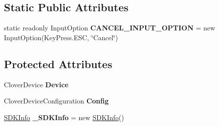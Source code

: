 \subsection*{Static Public Attributes}
\begin{DoxyCompactItemize}
\item 
\mbox{\label{classcom_1_1clover_1_1remotepay_1_1sdk_1_1_clover_connector_a1e3f722dd21198b83ac8eecbac983eb2}} 
static readonly Input\+Option {\bfseries C\+A\+N\+C\+E\+L\+\_\+\+I\+N\+P\+U\+T\+\_\+\+O\+P\+T\+I\+ON} = new Input\+Option(Key\+Press.\+E\+SC, \char`\"{}Cancel\char`\"{})
\end{DoxyCompactItemize}
\subsection*{Protected Attributes}
\begin{DoxyCompactItemize}
\item 
\mbox{\label{classcom_1_1clover_1_1remotepay_1_1sdk_1_1_clover_connector_ab2b2a13a2439cf33d0b83e31ba55d238}} 
Clover\+Device {\bfseries Device}
\item 
\mbox{\label{classcom_1_1clover_1_1remotepay_1_1sdk_1_1_clover_connector_a9e2be5acbf150aad37aed2d9670f38e0}} 
Clover\+Device\+Configuration {\bfseries Config}
\item 
\mbox{\label{classcom_1_1clover_1_1remotepay_1_1sdk_1_1_clover_connector_a873acd846f1efa474ad258356f2136cf}} 
\hyperlink{classcom_1_1clover_1_1remotepay_1_1sdk_1_1_s_d_k_info}{S\+D\+K\+Info} {\bfseries \+\_\+\+S\+D\+K\+Info} = new \hyperlink{classcom_1_1clover_1_1remotepay_1_1sdk_1_1_s_d_k_info}{S\+D\+K\+Info}()
\end{DoxyCompactItemize}
